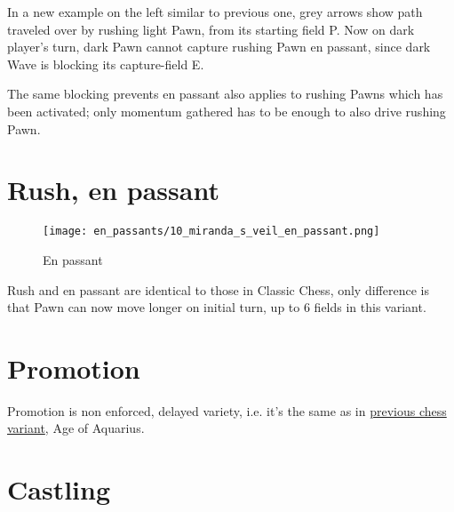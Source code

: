 In a new example on the left similar to previous one, grey arrows show path traveled
over by rushing light Pawn, from its starting field P. Now on dark player's turn,
dark Pawn cannot capture rushing Pawn en passant, since dark Wave is blocking its
capture-field E.

The same blocking prevents en passant also applies to rushing Pawns which has
been activated; only momentum gathered has to be enough to also drive rushing
Pawn.

\clearpage %

\section*{Rush, en passant}
\label{sec:Miranda's veil/Rush, en passant}

\noindent
\begin{wrapfigure}[5]{l}{0.4\textwidth}
\centering
\texttt{[image: en\_passants/10\_miranda\_s\_veil\_en\_passant.png]}
\caption{En passant}
\label{fig:10_miranda_s_veil_en_passant}
\end{wrapfigure}
Rush and en passant are identical to those in Classic Chess, only difference
is that Pawn can now move longer on initial turn, up to 6 fields in this
variant.


\vspace*{9.0\baselineskip}
\section*{Promotion}
\label{sec:Miranda's veil/Promotion}

Promotion is non enforced, delayed variety, i.e. it's the same as in
\hyperref[sec:Age of Aquarius/Promotion]{previous chess variant}, Age of Aquarius.

\clearpage %

\section*{Castling}
\label{sec:Miranda's veil/Castling}

